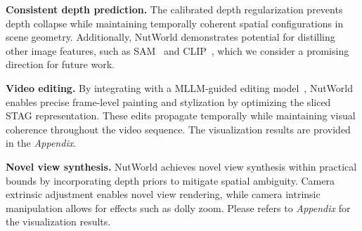 \noindent \textbf{Consistent depth prediction.} The calibrated depth regularization prevents depth collapse while maintaining temporally coherent spatial configurations in scene geometry. Additionally, NutWorld demonstrates potential for distilling other image features, such as SAM~\cite{kirillov2023segment} and CLIP~\cite{radford2021learning}, which we consider a promising direction for future work.



\noindent \textbf{Video editing.} By integrating with a MLLM-guided editing model~\cite{fu2023guiding}, NutWorld enables precise frame-level painting and stylization by optimizing the sliced STAG representation. These edits propagate temporally while maintaining visual coherence throughout the video sequence. The visualization results are provided in the \textit{Appendix}.

\noindent \textbf{Novel view synthesis.} NutWorld achieves novel view synthesis within practical bounds by incorporating depth priors to mitigate spatial ambiguity. Camera extrinsic adjustment enables novel view rendering, while camera intrinsic manipulation allows for effects such as dolly zoom. Please refers to \textit{Appendix} for the visualization results.






